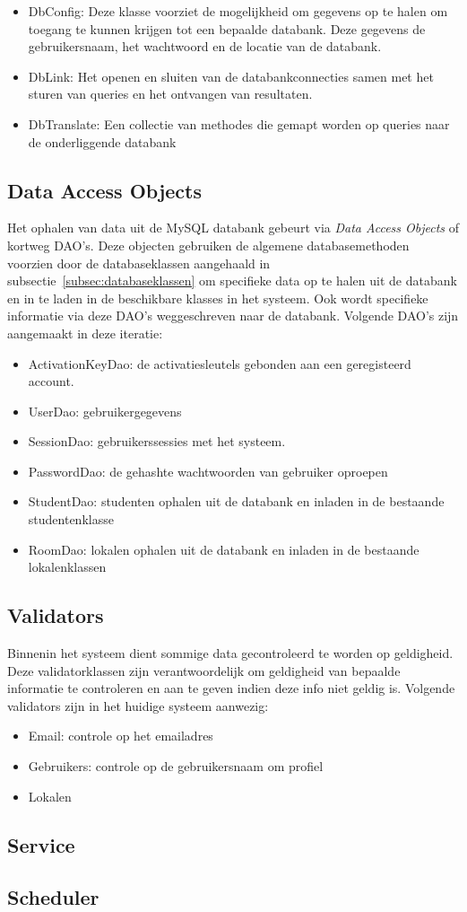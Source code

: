 \begin{itemize}
	\item DbConfig: Deze klasse voorziet de mogelijkheid om gegevens op te halen om toegang te kunnen krijgen tot een bepaalde databank. 
	Deze gegevens de gebruikersnaam, het wachtwoord en de locatie van de databank. 
	\item DbLink: Het openen en sluiten van de databankconnecties samen met het sturen van queries en het ontvangen van resultaten.
	\item DbTranslate: Een collectie van methodes die gemapt worden op queries naar de onderliggende databank
\end{itemize} 

\subsection{Data Access Objects}
\label{subsec:dao}

Het ophalen van data uit de MySQL databank gebeurt via \emph{Data Access Objects} of kortweg DAO's. 
Deze objecten gebruiken de algemene databasemethoden voorzien door de databaseklassen aangehaald in subsectie~\ref{subsec:databaseklassen} om specifieke data op te halen uit de databank en in te laden in de beschikbare klasses in het systeem. 
Ook wordt specifieke informatie via deze DAO's weggeschreven naar de databank. 
Volgende DAO's zijn aangemaakt in deze iteratie:

\begin{itemize}
	\item ActivationKeyDao: de activatiesleutels gebonden aan een geregisteerd account. 
	\item UserDao: gebruikergegevens
	\item SessionDao: gebruikerssessies met het systeem.
	\item PasswordDao: de gehashte wachtwoorden van gebruiker oproepen
	\item StudentDao: studenten ophalen uit de databank en inladen in de bestaande studentenklasse
	\item RoomDao: lokalen ophalen uit de databank en inladen in de bestaande lokalenklassen
\end{itemize}

\subsection{Validators}
\label{subsec:validators}

Binnenin het systeem dient sommige data gecontroleerd te worden op geldigheid. 
Deze validatorklassen zijn verantwoordelijk om geldigheid van bepaalde informatie te controleren en aan te geven indien deze info niet geldig is. 
Volgende validators zijn in het huidige systeem aanwezig:

\begin{itemize}
	\item Email: controle op het emailadres
	\item Gebruikers: controle op de gebruikersnaam om profiel
	\item Lokalen
\end{itemize}

\subsection{Service}
\label{subsec:service}
\subsection{Scheduler}
\label{subsec:scheduler}
